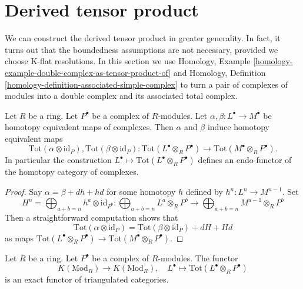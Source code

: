 \section{Derived tensor product}
\label{section-derived-tensor-product}

\noindent
We can construct the derived tensor product in greater generality.
In fact, it turns out that the boundedness assumptions are not
necessary, provided we choose K-flat resolutions.
In this section we use Homology, Example
\ref{homology-example-double-complex-as-tensor-product-of}
and
Homology, Definition \ref{homology-definition-associated-simple-complex}
to turn a pair of complexes of modules into a double complex
and its associated total complex.

\begin{lemma}
\label{lemma-derived-tor-homotopy}
Let $R$ be a ring.
Let $P^\bullet$ be a complex of $R$-modules.
Let $\alpha, \beta : L^\bullet \to M^\bullet$ be homotopy equivalent
maps of complexes. Then $\alpha$ and $\beta$ induce homotopy equivalent
maps
$$
\text{Tot}(\alpha \otimes \text{id}_P),
\text{Tot}(\beta \otimes \text{id}_P) :
\text{Tot}(L^\bullet \otimes_R P^\bullet)
\longrightarrow
\text{Tot}(M^\bullet \otimes_R P^\bullet).
$$
In particular the construction
$L^\bullet \mapsto \text{Tot}(L^\bullet \otimes_R P^\bullet)$
defines an endo-functor of the homotopy category of complexes.
\end{lemma}

\begin{proof}
Say $\alpha = \beta + dh + hd$ for some homotopy $h$ defined by
$h^n : L^n \to M^{n - 1}$. Set
$$
H^n = \bigoplus\nolimits_{a + b = n} h^a \otimes \text{id}_{P^b} :
\bigoplus\nolimits_{a + b = n} L^a \otimes_R P^b
\longrightarrow
\bigoplus\nolimits_{a + b = n} M^{a - 1} \otimes_R P^b
$$
Then a straightforward computation shows that
$$
\text{Tot}(\alpha \otimes \text{id}_P) =
\text{Tot}(\beta \otimes \text{id}_P) + dH + Hd
$$
as maps $\text{Tot}(L^\bullet \otimes_R P^\bullet) \to
\text{Tot}(M^\bullet \otimes_R P^\bullet)$.
\end{proof}

\begin{lemma}
\label{lemma-derived-tor-exact}
Let $R$ be a ring.
Let $P^\bullet$ be a complex of $R$-modules.
The functor
$$
K(\text{Mod}_R) \longrightarrow K(\text{Mod}_R), \quad
L^\bullet \longmapsto \text{Tot}(L^\bullet \otimes_R P^\bullet)
$$
is an exact functor of triangulated categories.
\end{lemma}

